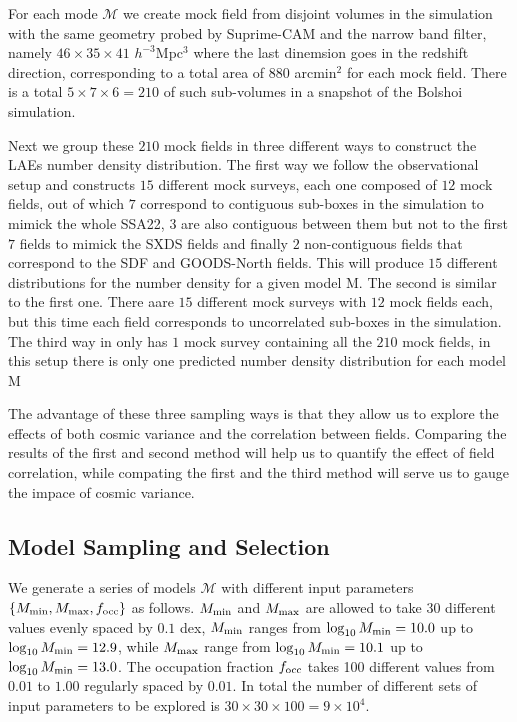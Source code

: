 \documentclass{emulateapj}
\begin{document}
For each mode ${\mathcal M}$ we create mock field from disjoint volumes in the simulation with the same geometry probed by Suprime-CAM and the narrow band filter, namely $46\times 35\times 41$ $h^{-3}$Mpc$^{3}$ where the last dinemsion goes in the redshift direction, corresponding to a total area of $880$ arcmin$^{2}$ for each mock field. There is a total $5\times 7 \times 6=210$ of such sub-volumes in a snapshot of the Bolshoi simulation. 

Next we group these $210$ mock fields in three different ways to construct the LAEs number density distribution. The first way we follow the observational setup and constructs $15$ different mock surveys, each one composed of $12$ mock fields, out of which $7$ correspond to contiguous sub-boxes in the simulation to mimick the whole SSA22, $3$ are also contiguous between them but not to the first $7$ fields to mimick the SXDS fields and finally $2$ non-contiguous fields that correspond to the SDF and GOODS-North fields. This will produce $15$ different distributions for the number density for a given model ${\mathrm M}$. The second is similar to the first one. There aare $15$ different mock surveys with $12$ mock fields each, but this time each field corresponds to uncorrelated sub-boxes in the simulation. The third way in only has $1$ mock survey containing all the $210$ mock fields, in this setup there is only one predicted number density distribution for each model ${\mathrm M}$

The advantage of these three sampling ways is that they allow us to explore the effects of both cosmic variance and the correlation between fields. Comparing the results of the first and second method will help us to quantify the effect of field correlation, while compating the first and the third method will serve us to gauge the impace of cosmic variance.


\subsection{Model Sampling and Selection}

We generate a series of models ${\mathcal M}$ with different input parameters$\{M_{\rm min}, M_{\rm max}, f_{\rm occ}\}$ as follows. $M_{\rm min}$ and $M_{\rm max}$ are allowed to take 30 different values evenly spaced by $0.1$ dex, $M_{\rm min}$ ranges from $\log_{10}M_{\rm min}=10.0$ up to $\log_{10}M_{\rm min}=12.9$, while $M_{\rm max}$ range  from $\log_{10}M_{\rm min}=10.1$ up to $\log_{10}M_{\rm min}=13.0$. The occupation fraction $f_{\rm occ}$ takes 100 different values from $0.01$ to $1.00$ regularly spaced by $0.01$. In total the number of different sets of input parameters to be explored is $30 \times 30\times 100 = 9\times 10^{4}$.
\end{document}
